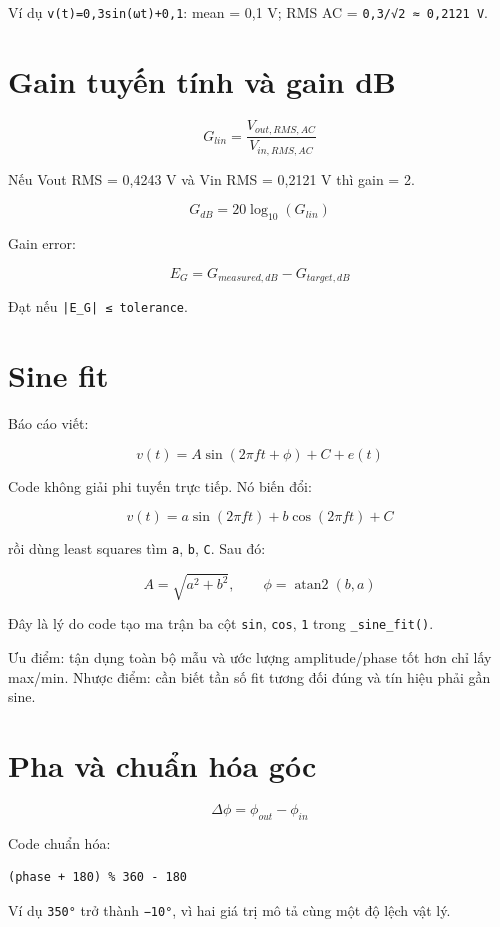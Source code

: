 \documentclass[12pt,a4paper,oneside]{article}
\newcommand{\inlinecode}[1]{\texttt{#1}}
\begin{document}
Ví dụ \inlinecode{v(t)=0,3sin(ωt)+0,1}: mean = 0,1 V; RMS AC = \inlinecode{0,3/√2 ≈ 0,2121 V}.

\section{Gain tuyến tính và gain dB}

\[
G_{lin}=\frac{V_{out,RMS,AC}}{V_{in,RMS,AC}}
\]

Nếu Vout RMS = 0,4243 V và Vin RMS = 0,2121 V thì gain = 2.

\[
G_{dB}=20\log_{10}(G_{lin})
\]

Gain error:

\[
E_G=G_{measured,dB}-G_{target,dB}
\]

Đạt nếu \inlinecode{|E\_G| ≤ tolerance}.

\section{Sine fit}

Báo cáo viết:

\[
v(t)=A\sin(2\pi ft+\phi)+C+e(t)
\]

Code không giải phi tuyến trực tiếp. Nó biến đổi:

\[
v(t)=a\sin(2\pi ft)+b\cos(2\pi ft)+C
\]

rồi dùng least squares tìm \inlinecode{a}, \inlinecode{b}, \inlinecode{C}. Sau đó:

\[
A=\sqrt{a^2+b^2},\qquad \phi=\operatorname{atan2}(b,a)
\]

Đây là lý do code tạo ma trận ba cột \inlinecode{sin}, \inlinecode{cos}, \inlinecode{1} trong \inlinecode{\_sine\_fit()}.

Ưu điểm: tận dụng toàn bộ mẫu và ước lượng amplitude/phase tốt hơn chỉ lấy max/min. Nhược điểm: cần biết tần số fit tương đối đúng và tín hiệu phải gần sine.

\section{Pha và chuẩn hóa góc}

\[
\Delta\phi=\phi_{out}-\phi_{in}
\]

Code chuẩn hóa:

\begin{Verbatim}[breaklines=true,breakanywhere=true,fontsize=\small]
(phase + 180) % 360 - 180
\end{Verbatim}

Ví dụ \inlinecode{350°} trở thành \inlinecode{−10°}, vì hai giá trị mô tả cùng một độ lệch vật lý.
\end{document}
